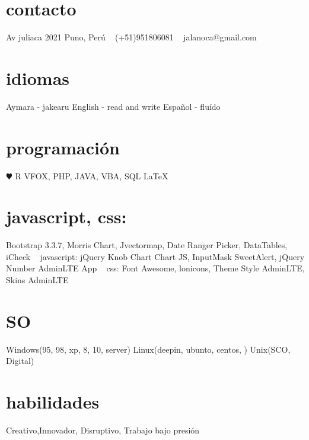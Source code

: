 \documentclass[]{cv-style}
\begin{document}
\lastupdated


\begin{aside}
%
\section{contacto}
Av juliaca 2021
Puno, Perú
~
 (+51)951806081
~
jalanoca@gmail.com
%
\section{idiomas}
Aymara - jakearu
English - read and write
Español - fluído
%
\section{programación}
{\color{red} $\varheartsuit$} R
VFOX, PHP, JAVA, VBA, SQL
\LaTeX{}
\section{javascript, css:}
Bootstrap 3.3.7, Morris Chart,
Jvectormap, Date Ranger Picker,
DataTables, iCheck
~
javascript:
jQuery Knob Chart  
Chart JS, InputMask  
SweetAlert, jQuery Number  
AdminLTE App  
~
css:
Font Awesome, lonicons, Theme Style AdminLTE, Skins AdminLTE  
\section{SO}
Windows(95, 98, xp, 8, 10, server)
Linux(deepin, ubunto, centos, )
Unix(SCO, Digital)
%
\end{aside}


\section{habilidades}
  \vspace{-0.2cm}
Creativo,Innovador, Disruptivo, Trabajo bajo presión 
\end{document}
